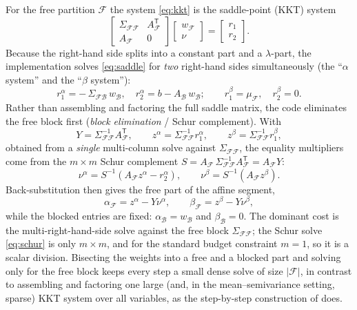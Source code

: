 \documentclass[11pt]{article}
\newcommand{\Sig}{\Sigma}
\newcommand{\F}{\mathcal{F}}        %
\newcommand{\B}{\mathcal{B}}        %
\newcommand{\trans}{^{\mathsf{T}}}
\newcommand{\inv}{^{-1}}
\begin{document}
For the free partition $\F$ the system \eqref{eq:kkt} is the saddle-point (KKT) system
\begin{equation}
\label{eq:saddle}
\begin{bmatrix} \Sig_{\F\F} & A_\F\trans \\[2pt] A_\F & 0 \end{bmatrix}
\begin{bmatrix} w_\F \\ \nu \end{bmatrix}
=
\begin{bmatrix} r_1 \\ r_2 \end{bmatrix}.
\end{equation}
Because the right-hand side splits into a constant part and a $\lambda$-part, the
implementation solves \eqref{eq:saddle} for \emph{two} right-hand sides simultaneously
(the ``$\alpha$ system'' and the ``$\beta$ system''):
\[
r_1^{\alpha} = -\,\Sig_{\F\B}\, w_\B, \quad r_2^{\alpha} = b - A_\B\, w_\B;
\qquad
r_1^{\beta} = \mu_\F, \quad r_2^{\beta} = 0 .
\]
Rather than assembling and factoring the full saddle matrix, the code eliminates the
free block first (\emph{block elimination} / Schur complement). With
\[
Y = \Sig_{\F\F}\inv A_\F\trans, \qquad
z^{\alpha} = \Sig_{\F\F}\inv r_1^{\alpha}, \qquad
z^{\beta} = \Sig_{\F\F}\inv r_1^{\beta},
\]
obtained from a \emph{single} multi-column solve against $\Sig_{\F\F}$, the equality
multipliers come from the $m\times m$ Schur complement
$S = A_\F\,\Sig_{\F\F}\inv A_\F\trans = A_\F Y$:
\begin{equation}
\label{eq:schur}
\nu^{\alpha} = S\inv\!\left(A_\F z^{\alpha} - r_2^{\alpha}\right),
\qquad
\nu^{\beta} = S\inv\!\left(A_\F z^{\beta}\right).
\end{equation}
Back-substitution then gives the free part of the affine segment,
\begin{equation}
\label{eq:freesoln}
\alpha_\F = z^{\alpha} - Y\nu^{\alpha},
\qquad
\beta_\F = z^{\beta} - Y\nu^{\beta},
\end{equation}
while the blocked entries are fixed: $\alpha_\B = w_\B$ and $\beta_\B = 0$. The
dominant cost is the multi-right-hand-side solve against the free block
$\Sig_{\F\F}$; the Schur solve \eqref{eq:schur} is only $m\times m$, and for the
standard budget constraint $m=1$, so it is a scalar division. Bisecting the weights
into a free and a blocked part and solving only for the free block keeps every step
a small dense solve of size $|\F|$, in contrast to assembling and factoring one
large (and, in the mean--semivariance setting, sparse) KKT system over all
variables, as the step-by-step construction of \citet{markowitz2021} does.
\end{document}
